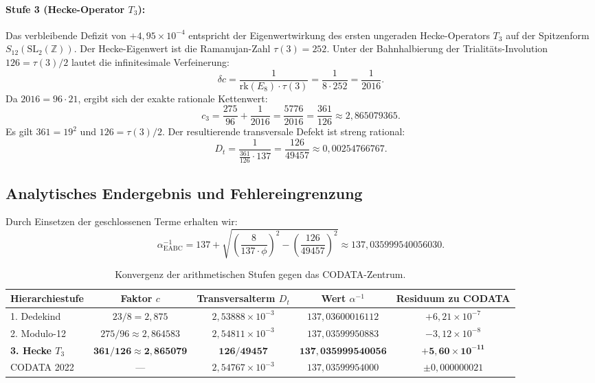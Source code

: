 \documentclass[11pt,a4paper]{article}
\begin{document}
\paragraph{Stufe 3 (Hecke-Operator $T_3$):}
Das verbleibende Defizit von $+4{,}95 \times 10^{-4}$ entspricht der Eigenwertwirkung des ersten ungeraden Hecke-Operators $T_3$ auf der Spitzenform $S_{12}(\mathrm{SL}_2(\mathbb{Z}))$. Der Hecke-Eigenwert ist die Ramanujan-Zahl $\tau(3) = 252$. Unter der Bahnhalbierung der Trialitäts-Involution $126 = \tau(3)/2$ lautet die infinitesimale Verfeinerung:
\begin{equation}
\delta c = \frac{1}{\mathrm{rk}(E_8) \cdot \tau(3)} = \frac{1}{8 \cdot 252} = \frac{1}{2016}.
\end{equation}
Da $2016 = 96 \cdot 21$, ergibt sich der exakte rationale Kettenwert:
\begin{equation}
c_3 = \frac{275}{96} + \frac{1}{2016} = \frac{5776}{2016} = \frac{361}{126} \approx 2{,}865079365.
\end{equation}
Es gilt $361 = 19^2$ und $126 = \tau(3)/2$. Der resultierende transversale Defekt ist streng rational:
\begin{equation}
D_t = \frac{1}{\frac{361}{126} \cdot 137} = \frac{126}{49457} \approx 0{,}00254766767.
\end{equation}

\subsection{Analytisches Endergebnis und Fehlereingrenzung}
Durch Einsetzen der geschlossenen Terme erhalten wir:
\begin{equation}
\alpha^{-1}_{\mathrm{EABC}} = 137 + \sqrt{\left(\frac{8}{137 \cdot \phi}\right)^2 - \left(\frac{126}{49457}\right)^2} \approx 137{,}035999540056030.
\end{equation}

\begin{table}[h!]
\centering
\small
\begin{tabular}{lcccc}
\toprule
\textbf{Hierarchiestufe} & \textbf{Faktor $c$} & \textbf{Transversalterm $D_t$} & \textbf{Wert $\alpha^{-1}$} & \textbf{Residuum zu CODATA} \\
\midrule
1. Dedekind & $23/8 = 2{,}875$ & $2{,}53888 \times 10^{-3}$ & $137{,}03600016112$ & $+6{,}21 \times 10^{-7}$ \\
2. Modulo-12 & $275/96 \approx 2{,}864583$ & $2{,}54811 \times 10^{-3}$ & $137{,}03599950883$ & $-3{,}12 \times 10^{-8}$ \\
\textbf{3. Hecke $T_3$} & $\mathbf{361/126 \approx 2{,}865079}$ & $\mathbf{126/49457}$ & $\mathbf{137{,}035999540056}$ & $\mathbf{+5{,}60 \times 10^{-11}}$ \\
\midrule
CODATA 2022 & — & $2{,}54767 \times 10^{-3}$ & $137{,}03599954000$ & $\pm 0{,}000000021$ \\
\bottomrule
\end{tabular}
\caption{Konvergenz der arithmetischen Stufen gegen das CODATA-Zentrum.}
\label{tab:convergence}
\end{table}
\end{document}
